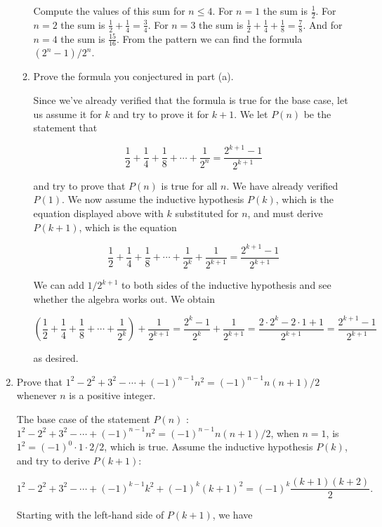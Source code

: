 \documentclass[11pt]{article}
\begin{document}
\begin{enumerate}[label=\textbf{\arabic*.}]
\begin{enumerate}[label=\textbf{\alph*)}]
		Compute the values of this sum for $n \leq 4$. For $n = 1$ the sum is $\frac{1}{2}$. For $n = 2$ the sum is $\frac{1}{2} + \frac{1}{4} = \frac{3}{4}$. For $n = 3$ the sum is $\frac{1}{2} + \frac{1}{4} + \frac{1}{8} = \frac{7}{8}$. And for $n = 4$ the sum is $\frac{15}{16}$. From the pattern we can find the formula $(2^n - 1)/2^n$.
		
		\item Prove the formula you conjectured in part (a).
		
		Since we've already verified that the formula is true for the base case, let us assume it for $k$ and try to prove it for $k + 1$. We let $P(n)$ be the statement that
		
		$$\frac{1}{2} + \frac{1}{4} + \frac{1}{8} + \cdots + \frac{1}{2^n} = \frac{2^{k + 1} - 1}{2^{k + 1}}$$
		
		and try to prove that $P(n)$ is true for all $n$. We have already verified $P(1)$. We now assume the inductive hypothesis $P(k)$, which is the equation displayed above with $k$ substituted for $n$, and must derive $P(k + 1)$, which is the equation
		
		$$\frac{1}{2} + \frac{1}{4} + \frac{1}{8} + \cdots + \frac{1}{2^k} + \frac{1}{2^{k + 1}} = \frac{2^{k + 1} - 1}{2^{k + 1}}$$
		
		We can add $1 / 2^{k + 1}$ to both sides of the inductive hypothesis and see whether the algebra works out. We obtain
		
		$$(\frac{1}{2} + \frac{1}{4} + \frac{1}{8} + \cdots + \frac{1}{2^k}) + \frac{1}{2^{k + 1}} = \frac{2^k - 1}{2^k} + \frac{1}{2^{k + 1}} = \frac{2 \cdot 2^k - 2 \cdot 1 + 1}{2^{k + 1}} = \frac{2^{k + 1} - 1}{2^{k + 1}}$$
		
		as desired.
	\end{enumerate}

	\item Prove that $1^2 - 2^2 + 3^2 - \cdots + (-1)^{n - 1}n^2 = (-1)^{n - 1}n(n + 1) / 2$ whenever $n$ is a positive integer.
	
	The base case of the statement $P(n)$ : $1^2 - 2^2 + 3^2 - \cdots + (-1)^{n - 1}n^2 = (-1)^{n - 1}n(n + 1) / 2$, when $n = 1$, is $1^2 = (-1)^0 \cdot 1 \cdot 2 / 2$, which is true. Assume the inductive hypothesis $P(k)$, and try to derive $P(k + 1)$:
	
	$$1^2 - 2^2 + 3^2 - \cdots + (-1)^{k - 1}k^2 + (-1)^k(k + 1)^2 = (-1)^k\frac{(k + 1)(k + 2)}{2}.$$
	
	Starting with the left-hand side of $P(k + 1)$, we have


\end{enumerate}
\end{document}

